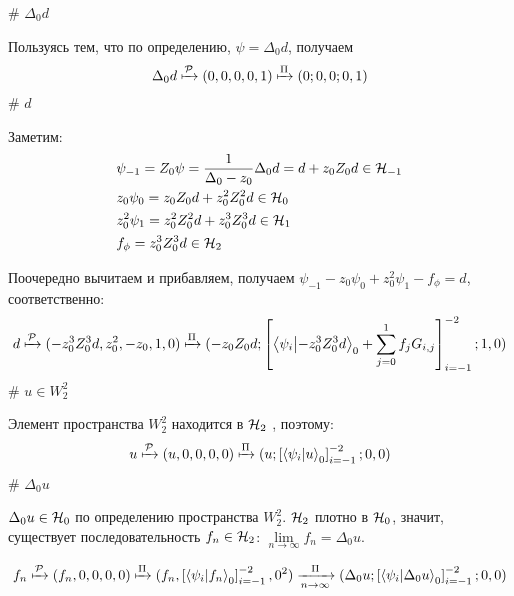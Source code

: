 \begin{elist}
# $\Delta_0 d$

Пользуясь тем, что по определению, $\psi = \Delta_0 d$, получаем
\[
\Delta_0 d \xmapsto[]{\mathcal{P}} (0, 0, 0, 0, 1) \xmapsto[]{\Pi} (0; 0, 0; 0, 1)
\]
# $d$

Заметим:
\begin{align*}
& \psi_{-1} = Z_0 \psi = \frac{1}{\Delta_0 - z_0} \Delta_0 d = d + z_0 Z_0 d \in \mathcal{H}_{-1} \\
& z_0 \psi_{0} = z_0 Z_0 d + z_0^2 Z_0^2 d \in \mathcal{H}_{0} \\
& z_0^2 \psi_{1} = z_0^2 Z_0^2 d + z_0^3 Z_0^3 d \in \mathcal{H}_{1} \\
& f_\phi = z_0^3 Z_0^3 d \in \mathcal{H}_{2}
\end{align*}

Поочередно вычитаем и прибавляем, получаем  $\psi_{-1} - z_0 \psi_0 + z_0^2 \psi_1 - f_\phi =  d$, соответственно:
\[
d \xmapsto[]{\mcP} (-z_0^3 Z_0^3 d, z_0^2, -z_0, 1, 0) \xmapsto[]{\Pi} (-z_0 Z_0 d; \left[ \ip{\psi_i}{-z_0^3 Z_0^3 d}_0 + \sum\limits_{j = 0}^1 f_j G_{i, j} \right]_{i = -1}^{-2};1, 0)
\]
# $u \in W_2^2$

Элемент пространства $W_2^2$ находится в $\mathcal{H}_{2}$ , поэтому:
\[
u \xmapsto[]{\mcP} (u, 0, 0, 0, 0) \xmapsto[]{\Pi} (u;\left[ \ip{\psi_i}{u}_0 \right]_{i = -1}^{-2}; 0, 0)
\]
# $\Delta_0 u$

$\Delta_0 u \in \mathcal{H}_{0}$ по определению пространства $W_2^2$. $\mathcal{H}_{2}$ плотно в $\mathcal{H}_{0}$, значит, существует последовательность $f_n \in \mathcal{H}_{2}$: $\lim\limits_{n \to \infty} f_n = \Delta_0 u$.

\[f_n \xmapsto[]{\mcP} (f_n, 0, 0, 0, 0) \xmapsto[]{\Pi} (f_n, \left[ \ip{\psi_i}{f_n}_0 \right]_{i = -1}^{-2}, 0^2) \xrightarrow[n \to \infty]{\Pi} (\Delta_0 u; \left[ \ip{\psi_i}{\Delta_0 u}_0 \right]_{i = -1}^{-2}; 0, 0)\]
\end{elist}

